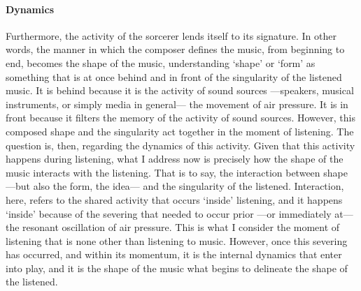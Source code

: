 \paragraph{Dynamics}
Furthermore, the activity of the sorcerer lends itself to its signature. In other words, the manner in which the composer defines the music, from beginning to end, becomes the shape of the music, understanding `shape' or `form' as something that is at once behind and in front of the singularity of the listened music. It is behind because it is the activity of sound sources ---speakers, musical instruments, or simply media in general--- the movement of air pressure. It is in front because it filters the memory of the activity of sound sources. However, this composed shape and the singularity act together in the moment of listening. The question is, then, regarding the dynamics of this activity. Given that this activity happens during listening, what I address now is precisely how the shape of the music interacts with the listening. That is to say, the interaction between shape ---but also the form, the idea--- and the singularity of the listened. Interaction, here, refers to the shared activity that occurs `inside' listening, and it happens `inside' because of the severing that needed to occur prior ---or immediately at--- the resonant oscillation of air pressure. This is what I consider the moment of listening that is none other than listening to music. However, once this severing has occurred, and within its momentum, it is the internal dynamics that enter into play, and it is the shape of the music what begins to delineate the shape of the listened.

